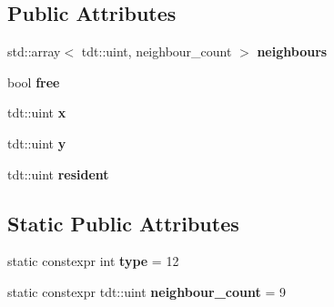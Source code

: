 \subsection*{Public Attributes}
\begin{DoxyCompactItemize}
\item 
std\+::array$<$ tdt\+::uint, neighbour\+\_\+count $>$ {\bfseries neighbours}\hypertarget{struct_grid_node_component_a99fa024aa011459aa23c4da8efa6d9d0}{}\label{struct_grid_node_component_a99fa024aa011459aa23c4da8efa6d9d0}

\item 
bool {\bfseries free}\hypertarget{struct_grid_node_component_a4d722929170f8c1104061f38043943cb}{}\label{struct_grid_node_component_a4d722929170f8c1104061f38043943cb}

\item 
tdt\+::uint {\bfseries x}\hypertarget{struct_grid_node_component_a518e682bff9cd395fe57bb86742e0b14}{}\label{struct_grid_node_component_a518e682bff9cd395fe57bb86742e0b14}

\item 
tdt\+::uint {\bfseries y}\hypertarget{struct_grid_node_component_a3fc0057724fc52388187d7a82a70c14b}{}\label{struct_grid_node_component_a3fc0057724fc52388187d7a82a70c14b}

\item 
tdt\+::uint {\bfseries resident}\hypertarget{struct_grid_node_component_a5b4f9edae85a3342902def0627fed940}{}\label{struct_grid_node_component_a5b4f9edae85a3342902def0627fed940}

\end{DoxyCompactItemize}
\subsection*{Static Public Attributes}
\begin{DoxyCompactItemize}
\item 
static constexpr int {\bfseries type} = 12\hypertarget{struct_grid_node_component_abd186813039033a7524a8486fdf617fb}{}\label{struct_grid_node_component_abd186813039033a7524a8486fdf617fb}

\item 
static constexpr tdt\+::uint {\bfseries neighbour\+\_\+count} = 9\hypertarget{struct_grid_node_component_ab4e07fad257964739fccf20344cf355d}{}\label{struct_grid_node_component_ab4e07fad257964739fccf20344cf355d}

\end{DoxyCompactItemize}



